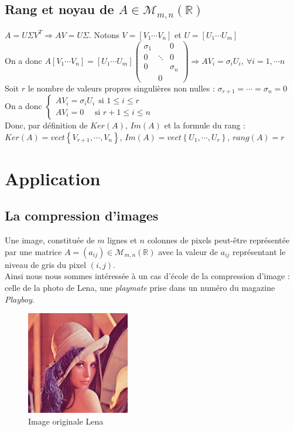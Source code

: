\documentclass[a4paper,10pt]{report}
\begin{document}
\subsection{Rang et noyau de $A \in \mathcal{M}_{m,n}(\mathbb{R})$}
\noindent $A=U\Sigma V^T \Rightarrow AV=U\Sigma$. Notons $V=[V_1 \cdots V_n]$ et $U=[U_1 \cdots U_m]$\\
On a donc $A[V_1 \cdots V_n]=[U_1 \cdots U_m]\left( \begin{array}{ccc} \sigma_1 & & 0 \\ 0 & \ddots & 0 \\ 0 & & \sigma_n \\ & 0 & \end{array} \right) \Rightarrow AV_i=\sigma_iU_i, \ \forall i=1,\cdots n$\\
Soit $r$ le nombre de valeurs propres singulières non nulles : $\sigma_{r+1}=\cdots=\sigma_n=0$\\
On a donc $\left\lbrace
\begin{array}{l}
AV_i=\sigma_iU_i \ \ \text{si } 1\leq i \leq r\\
AV_i=0 \ \ \ \ \ \ \text{si } r+1\leq i \leq n
\end{array}\right.$\\
Donc, par définition de $Ker(A)$, $Im(A)$ et la formule du rang :\\
$Ker(A)=vect\left\lbrace V_{r+1},\cdots,V_n \right\rbrace$, $Im(A)=vect\left\lbrace U_1,\cdots,U_r\right\rbrace$, $rang(A)=r$

\newpage
\section{Application}
\subsection{La compression d'images}
Une image, constituée de $m$ lignes et $n$ colonnes de pixels peut-être représentée par une matrice $A = (a_{ij}) \in \mathcal{M}_{m,n}(\mathbb{R})$ avec la valeur de $a_{ij}$ représentant le niveau de gris du pixel $(i,j)$.\\
Ainsi nous nous sommes intéressée à un cas d'école de la compression d'image : celle de la photo de Lena, une \textit{playmate} prise dans un numéro du magazine \textit{Playboy}.
\begin{figure}[H]
\centering
\caption{Image originale Lena}
\includegraphics[width=4.5cm]{lena.png}
\end{figure}
\end{document}
